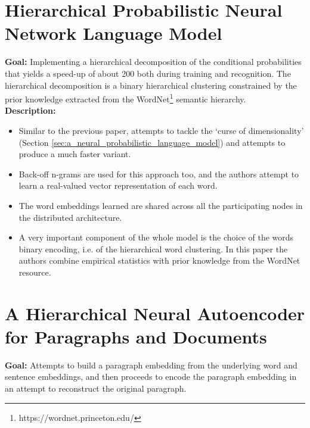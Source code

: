\documentclass[11pt,a4paper]{article}
\begin{document}


\section{Hierarchical Probabilistic Neural Network Language Model} %
\label{sec:hierarchical_probabilistic_neural_network_language_model}

  \textbf{Goal:}
  Implementing a  hierarchical decomposition of the conditional probabilities that yields a speed-up of about 200 both during training and recognition. The hierarchical decomposition is a binary hierarchical clustering constrained by the prior knowledge extracted from the WordNet\footnote{https://wordnet.princeton.edu/} semantic hierarchy\cite{morin2005hierarchical}.\\

  \textbf{Description:}
  \begin{itemize}
    \item
    Similar to the previous paper, attempts to tackle the `curse of dimensionality' (Section \ref{sec:a_neural_probabilistic_language_model}) and attempts to produce a much faster variant.
    \item
    Back-off n-grams are used for this approach too, and the authors attempt to learn a real-valued vector representation of each word.
    \item
    The word embeddings learned are shared across all the participating nodes in the distributed architecture.
    \item
    A very important component of the whole model is the choice of the words binary encoding, i.e. of the hierarchical word clustering. In this paper the authors combine empirical statistics with prior knowledge from the WordNet resource.
  \end{itemize}



\section{A Hierarchical Neural Autoencoder for Paragraphs and Documents} %
\label{sec:a_hierarchical_neural_autoencoder_for_paragraphs_and_documents}

  \textbf{Goal:}
  Attempts to build a paragraph embedding from the underlying word and sentence embeddings, and then proceeds to encode the paragraph embedding in an attempt to reconstruct the original paragraph\cite{li2015hierarchical}.\\
\end{document}
